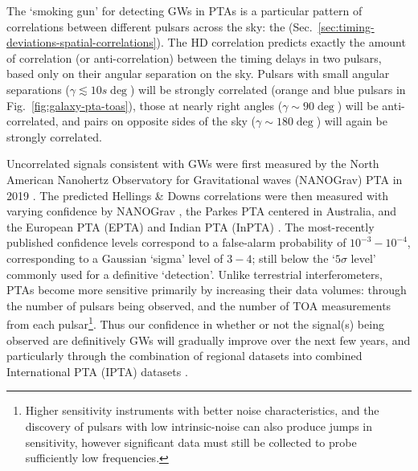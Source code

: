 \documentclass[onecolumn,authoryear]{els-mrw}
\begin{document}
The `smoking gun' for detecting GWs in PTAs is a particular pattern of correlations between different pulsars across the sky: the  (Sec.~\ref{sec:timing-deviations-spatial-correlations}).  The HD correlation predicts exactly the amount of correlation (or anti-correlation) between the timing delays in two pulsars, based only on their angular separation on the sky.  Pulsars with small angular separations ($\gamma \lesssim 10s \deg$) will be strongly correlated (orange and blue pulsars in Fig.~\ref{fig:galaxy-pta-toas}), those at nearly right angles ($\gamma \sim 90 \deg$) will be anti-correlated, and pairs on opposite sides of the sky ($\gamma \sim 180 \deg$) will again be strongly correlated.

Uncorrelated signals consistent with GWs were first measured by the North American Nanohertz Observatory for Gravitational waves (NANOGrav) PTA in 2019 \citep{Arzoumanian+2020}.  The predicted Hellings \& Downs correlations were then measured with varying confidence by NANOGrav \citep{Agazie+2023}, the Parkes PTA \citep[PPTA;][]{Reardon+2023} centered in Australia, and the European PTA (EPTA) and Indian PTA (InPTA) \citep{Antoniadis+2023}.  The most-recently published confidence levels correspond to a false-alarm probability of $10^{-3} - 10^{-4}$, corresponding to a Gaussian `sigma' level of $3-4$; still below the `$5\sigma$ level' commonly used for a definitive `detection'.  Unlike terrestrial interferometers, PTAs become more sensitive primarily by increasing their data volumes: through the number of pulsars being observed, and the number of TOA measurements from each pulsar\footnote{Higher sensitivity instruments with better noise characteristics, and the discovery of pulsars with low intrinsic-noise can also produce jumps in sensitivity, however significant data must still be collected to probe sufficiently low frequencies.}.  Thus our confidence in whether or not the signal(s) being observed are definitively GWs will gradually improve over the next few years, and particularly through the combination of regional datasets into combined International PTA (IPTA) datasets \citep{Antoniadis+2022}.
\end{document}
